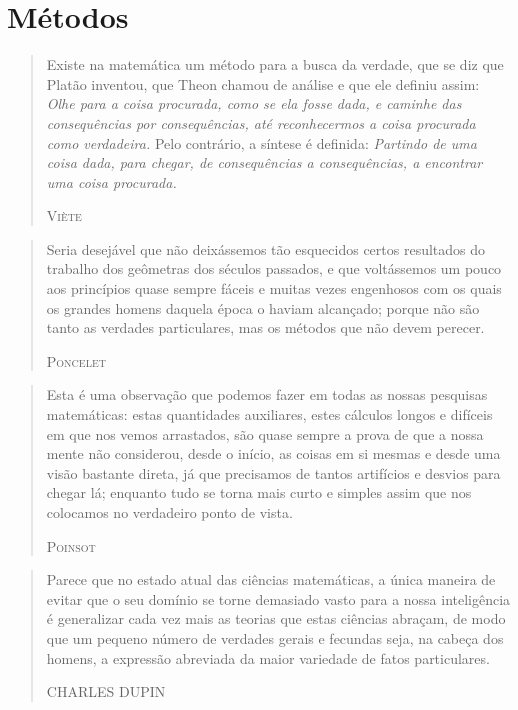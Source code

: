 \documentclass{hipatia}
\begin{document}
 

\section{Métodos}


\begin{quote}
Existe na matemática um método para a busca da verdade, que se diz que Platão inventou, que Theon chamou de análise e que ele definiu assim: \emph{Olhe para a coisa procurada, como se ela fosse dada, e caminhe das consequências por consequências, até reconhecermos a coisa procurada como verdadeira.} Pelo contrário, a síntese é definida: \emph{Partindo de uma coisa dada, para chegar, de consequências a consequências, a encontrar uma coisa procurada.}

\hfill \textsc{Viète}
\end{quote}

 
 
\begin{quote}
Seria desejável que não deixássemos tão esquecidos certos resultados do trabalho dos geômetras dos séculos passados, e que voltássemos um pouco aos princípios quase sempre fáceis e muitas vezes engenhosos com os quais os grandes homens daquela época o haviam alcançado; porque não são tanto as verdades particulares, mas os métodos que não devem perecer.

\hfill \textsc{Poncelet}
\end{quote}
 


\begin{quote}
Esta é uma observação que podemos fazer em todas as nossas pesquisas matemáticas: estas quantidades auxiliares, estes cálculos longos e difíceis em que nos vemos arrastados, são quase sempre a prova de que a nossa mente não considerou, desde o início, as coisas em si mesmas e desde uma visão bastante direta, já que precisamos de tantos artifícios e desvios para chegar lá; enquanto tudo se torna mais curto e simples assim que nos colocamos no verdadeiro ponto de vista.


\hfill \textsc{Poinsot}
\end{quote}


 
\begin{quote}
Parece que no estado atual das ciências matemáticas, a única maneira de evitar que o seu domínio se torne demasiado vasto para a nossa inteligência é generalizar cada vez mais as teorias que estas ciências abraçam, de modo que um pequeno número de verdades gerais e fecundas seja, na cabeça dos homens, a expressão abreviada da maior variedade de fatos particulares.

\hfill \textsc{CHARLES DUPIN}
\end{quote}
 
\end{document}
